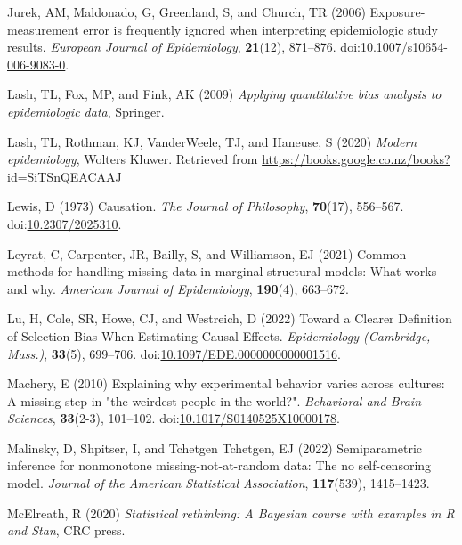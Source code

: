\documentclass[
  single column]{article}
\newlength{\cslhangindent}
\newenvironment{CSLReferences}[2] %
 {\begin{list}{}{%
  \setlength{\itemindent}{0pt}
  \setlength{\leftmargin}{0pt}
  \setlength{\parsep}{0pt}
  \ifodd #1
   \setlength{\leftmargin}{\cslhangindent}
   \setlength{\itemindent}{-1\cslhangindent}
  \fi
  \setlength{\itemsep}{#2\baselineskip}}}
 {\end{list}}
\begin{document}
\begin{CSLReferences}{1}{0}
Jurek, AM, Maldonado, G, Greenland, S, and Church, TR (2006)
Exposure-measurement error is frequently ignored when interpreting
epidemiologic study results. \emph{European Journal of Epidemiology},
\textbf{21}(12), 871--876.
doi:\href{https://doi.org/10.1007/s10654-006-9083-0}{10.1007/s10654-006-9083-0}.

Lash, TL, Fox, MP, and Fink, AK (2009) \emph{Applying quantitative bias
analysis to epidemiologic data}, Springer.

Lash, TL, Rothman, KJ, VanderWeele, TJ, and Haneuse, S (2020)
\emph{Modern epidemiology}, Wolters Kluwer. Retrieved from
\url{https://books.google.co.nz/books?id=SiTSnQEACAAJ}

Lewis, D (1973) Causation. \emph{The Journal of Philosophy},
\textbf{70}(17), 556--567.
doi:\href{https://doi.org/10.2307/2025310}{10.2307/2025310}.

Leyrat, C, Carpenter, JR, Bailly, S, and Williamson, EJ (2021) Common
methods for handling missing data in marginal structural models: What
works and why. \emph{American Journal of Epidemiology}, \textbf{190}(4),
663--672.

Lu, H, Cole, SR, Howe, CJ, and Westreich, D (2022) Toward a Clearer
Definition of Selection Bias When Estimating Causal Effects.
\emph{Epidemiology (Cambridge, Mass.)}, \textbf{33}(5), 699--706.
doi:\href{https://doi.org/10.1097/EDE.0000000000001516}{10.1097/EDE.0000000000001516}.

Machery, E (2010) Explaining why experimental behavior varies across
cultures: A missing step in "the weirdest people in the world?".
\emph{Behavioral and Brain Sciences}, \textbf{33}(2-3), 101--102.
doi:\href{https://doi.org/10.1017/S0140525X10000178}{10.1017/S0140525X10000178}.

Malinsky, D, Shpitser, I, and Tchetgen Tchetgen, EJ (2022)
Semiparametric inference for nonmonotone missing-not-at-random data: The
no self-censoring model. \emph{Journal of the American Statistical
Association}, \textbf{117}(539), 1415--1423.

McElreath, R (2020) \emph{Statistical rethinking: A {B}ayesian course
with examples in {R} and {S}tan}, CRC press.


\end{CSLReferences}
\end{document}
